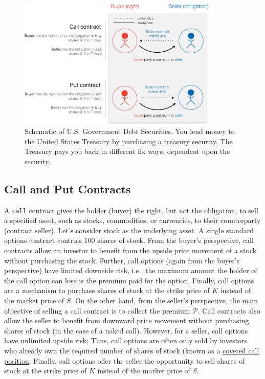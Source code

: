 \documentclass[11pt]{article}
\theoremstyle{definition}
\begin{document}
\begin{figure}[ht]
    \centering
    \includegraphics[width=0.85\textwidth]{./figs/Fig-Options-Table-Schematic.pdf}
    \caption{Schematic of U.S. Government Debt Securities. You lend money to the United States Treasury by purchasing a treasury security.
	The Treasury pays you back in different fix ways, dependent upon the security.}\label{fig:options-schematic}
\end{figure}

\subsection*{Call and Put Contracts}
A \texttt{call} contract gives the holder (buyer) the right, but not the obligation, to sell a specified asset, 
such as stocks, commodities, or currencies, to their counterparty (contract seller). 
Let's consider stock as the underlying asset. A single standard options contract controls 100 shares of stock. 
From the buyer's perspective, call contracts allow an investor to benefit from the upside price movement of a stock without purchasing the stock.
Further, call options (again from the buyer's perspective) have limited downside risk, i.e., the maximum amount the holder of the call option can lose 
is the premium paid for the option. Finally, call options are a mechanism to purchase shares of stock at the strike price of $K$ instead of the market price of $S$. 
On the other hand, from the seller's perspective, the main objective of selling a call contract is to collect the premium $\mathcal{P}$. 
Call contracts also allow the seller to benefit from downward price movement without purchasing shares of stock (in the case of a naked call).
However, for a seller, call options have unlimited upside risk; 
Thus, call options are often only sold by investors who already own the required number of shares of stock 
(known as a \href{https://www.investopedia.com/terms/c/coveredcall.asp}{covered call position}. 
Finally, call options offer the seller the opportunity to sell shares of stock at the strike price of $K$ instead of the market price of $S$.
\end{document}
